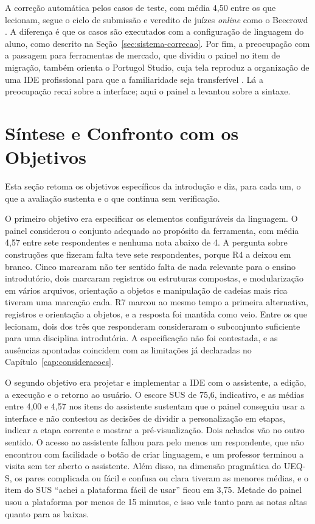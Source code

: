 A correção automática pelos casos de teste, com média 4,50 entre os que lecionam, segue o ciclo de submissão e veredito de juízes \textit{online} como o Beecrowd \cite{beecrowd2026faq}. A diferença é que os casos são executados com a configuração de linguagem do aluno, como descrito na Seção~\ref{sec:sistema-correcao}. Por fim, a preocupação com a passagem para ferramentas de mercado, que dividiu o painel no item de migração, também orienta o Portugol Studio, cuja tela reproduz a organização de uma IDE profissional para que a familiaridade seja transferível \cite{univali2026}. Lá a preocupação recai sobre a interface; aqui o painel a levantou sobre a sintaxe.

\section{Síntese e Confronto com os Objetivos}
\label{sec:resultado-sintese}

Esta seção retoma os objetivos específicos da introdução e diz, para cada um, o que a avaliação sustenta e o que continua sem verificação.

O primeiro objetivo era especificar os elementos configuráveis da linguagem. O painel considerou o conjunto adequado ao propósito da ferramenta, com média 4,57 entre sete respondentes e nenhuma nota abaixo de 4. A pergunta sobre construções que fizeram falta teve sete respondentes, porque R4 a deixou em branco. Cinco marcaram não ter sentido falta de nada relevante para o ensino introdutório, dois marcaram registros ou estruturas compostas, e modularização em vários arquivos, orientação a objetos e manipulação de cadeias mais rica tiveram uma marcação cada. R7 marcou ao mesmo tempo a primeira alternativa, registros e orientação a objetos, e a resposta foi mantida como veio. Entre os que lecionam, dois dos três que responderam consideraram o subconjunto suficiente para uma disciplina introdutória. A especificação não foi contestada, e as ausências apontadas coincidem com as limitações já declaradas no Capítulo~\ref{cap:consideracoes}.

O segundo objetivo era projetar e implementar a IDE com o assistente, a edição, a execução e o retorno ao usuário. O escore SUS de 75,6, indicativo, e as médias entre 4,00 e 4,57 nos itens do assistente sustentam que o painel conseguiu usar a interface e não contestou as decisões de dividir a personalização em etapas, indicar a etapa corrente e mostrar a pré-visualização. Dois achados vão no outro sentido. O acesso ao assistente falhou para pelo menos um respondente, que não encontrou com facilidade o botão de criar linguagem, e um professor terminou a visita sem ter aberto o assistente. Além disso, na dimensão pragmática do UEQ-S, os pares complicada ou fácil e confusa ou clara tiveram as menores médias, e o item do SUS ``achei a plataforma fácil de usar'' ficou em 3,75. Metade do painel usou a plataforma por menos de 15 minutos, e isso vale tanto para as notas altas quanto para as baixas.

